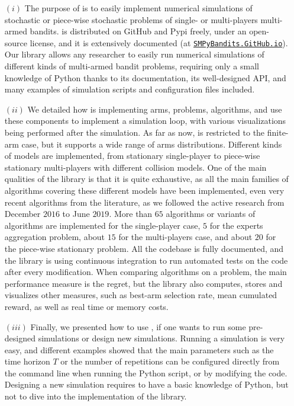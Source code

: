 \begin{itemize}
    \item[$(i)$]
The purpose of \SMPyBandits{} is to easily implement numerical simulations of stochastic or piece-wise stochastic problems of single- or multi-players multi-armed bandits.
\SMPyBandits{} is distributed on GitHub and Pypi freely, under an open-source license, and it is extensively documented (at \href{https://SMPyBandits.GitHub.io}{\texttt{SMPyBandits.GitHub.io}}).
Our library allows any researcher to easily run numerical simulations of different kinds of multi-armed bandit problems, requiring only a small knowledge of Python thanks to its documentation, its well-designed API, and many examples of simulation scripts and configuration files included.

    \item[$(ii)$]
We detailed how \SMPyBandits{} is implementing arms, problems, algorithms, and use these components to implement a simulation loop, with various visualizations being performed after the simulation.
As far as now, \SMPyBandits{} is restricted to the finite-arm case, but it supports a wide range of arms distributions.
Different kinds of models are implemented, from stationary single-player to piece-wise stationary multi-players with different collision models.
One of the main qualities of the library is that it is quite exhaustive, as all the main families of algorithms covering these different models have been implemented, even very recent algorithms from the literature, as we followed the active research from December $2016$ to June $2019$.
More than $65$ algorithms or variants of algorithms are implemented for the single-player case, $5$ for the experts aggregation problem, about $15$ for the multi-players case, and about $20$ for the piece-wise stationary problem.
All the codebase is fully documented, and the library is using continuous integration to run automated tests on the code after every modification.
%
When comparing algorithms on a problem, the main performance measure is the regret, but the library also computes, stores and visualizes other measures, such as best-arm selection rate, mean cumulated reward, as well as real time or memory costs.

    \item[$(iii)$]
Finally, we presented how to use \SMPyBandits, if one wants to run some pre-designed simulations or design new simulations.
Running a simulation is very easy, and different examples showed that the main parameters such as the time horizon $T$ or the number of repetitions can be configured directly from the command line when running the Python script, or by modifying the code.
Designing a new simulation requires to have a basic knowledge of Python, but not to dive into the implementation of the library.
\end{itemize}


